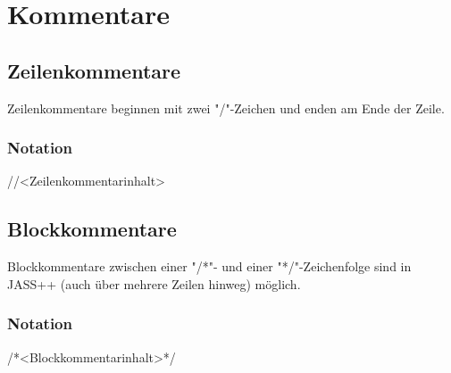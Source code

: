 \chapter { Kommentare }

\section { Zeilenkommentare }
Zeilenkommentare beginnen mit zwei "/"-Zeichen und enden am Ende der Zeile.

\subsection { Notation }
//<Zeilenkommentarinhalt>

\section { Blockkommentare }
Blockkommentare zwischen einer "/*"- und einer "*/"-Zeichenfolge sind in JASS++ (auch über mehrere Zeilen hinweg) möglich.

\subsection { Notation }
/*<Blockkommentarinhalt>*/ 
